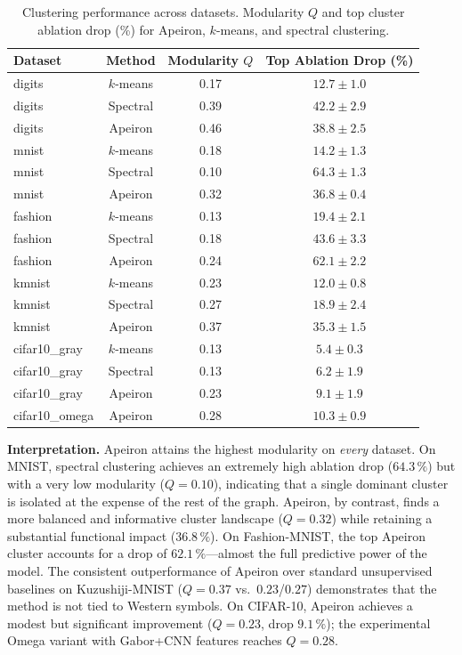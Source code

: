 \begin{table}[htbp]
\centering
\caption{Clustering performance across datasets. Modularity \(Q\) and top
cluster ablation drop (\%) for Apeiron, \(k\)-means, and spectral
clustering.}
\label{tab:all_experiments}
\begin{tabular}{l c c c}
\toprule
\textbf{Dataset} & \textbf{Method} & \textbf{Modularity \(Q\)} & \textbf{Top Ablation Drop (\%)} \\
\midrule
digits & \(k\)-means & 0.17 & \(12.7 \pm 1.0\) \\
digits & Spectral & 0.39 & \(42.2 \pm 2.9\) \\
digits & Apeiron & 0.46 & \(38.8 \pm 2.5\) \\
\midrule
mnist & \(k\)-means & 0.18 & \(14.2 \pm 1.3\) \\
mnist & Spectral & 0.10 & \(64.3 \pm 1.3\) \\
mnist & Apeiron & 0.32 & \(36.8 \pm 0.4\) \\
\midrule
fashion & \(k\)-means & 0.13 & \(19.4 \pm 2.1\) \\
fashion & Spectral & 0.18 & \(43.6 \pm 3.3\) \\
fashion & Apeiron & 0.24 & \(62.1 \pm 2.2\) \\
\midrule
kmnist & \(k\)-means & 0.23 & \(12.0 \pm 0.8\) \\
kmnist & Spectral & 0.27 & \(18.9 \pm 2.4\) \\
kmnist & Apeiron & 0.37 & \(35.3 \pm 1.5\) \\
\midrule
cifar10\_gray & \(k\)-means & 0.13 & \(5.4 \pm 0.3\) \\
cifar10\_gray & Spectral & 0.13 & \(6.2 \pm 1.9\) \\
cifar10\_gray & Apeiron & 0.23 & \(9.1 \pm 1.9\) \\
\midrule
cifar10\_omega & Apeiron & 0.28 & \(10.3 \pm 0.9\) \\
\bottomrule
\end{tabular}
\end{table}

\textbf{Interpretation.}
Apeiron attains the highest modularity on \emph{every} dataset.  On
MNIST, spectral clustering achieves an extremely high ablation drop
(\(64.3\,\%\)) but with a very low modularity (\(Q=0.10\)), indicating
that a single dominant cluster is isolated at the expense of the rest
of the graph.  Apeiron, by contrast, finds a more balanced and
informative cluster landscape (\(Q=0.32\)) while retaining a substantial
functional impact (\(36.8\,\%\)).  On Fashion-MNIST, the top Apeiron
cluster accounts for a drop of \(62.1\,\%\)---almost the full predictive
power of the model.  The consistent outperformance of Apeiron over
standard unsupervised baselines on Kuzushiji-MNIST (\(Q=0.37\) vs.\ 
\(0.23\)/\(0.27\)) demonstrates that the method is not tied to Western
symbols.  On CIFAR-10, Apeiron achieves a modest but significant
improvement (\(Q=0.23\), drop \(9.1\,\%\)); the experimental Omega variant
with Gabor+CNN features reaches \(Q=0.28\).

